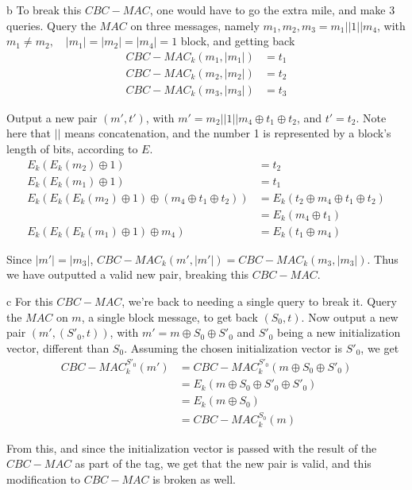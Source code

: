 \documentclass{article}
\begin{document}
\begin{paragraph}
    b To break this $CBC-MAC$, one would have to go the extra mile, and make 3 queries. Query the $MAC$ on three messages, namely $m_1, m_2, m_3 = m_1 || 1 || m_4$, with $m_1 \neq m_2, \quad |m_1| = |m_2| = |m_4| = 1$ block, and getting back
    \begin{align*}
        CBC-MAC_k(m_1, |m_1|) &= t_1\\
        CBC-MAC_k(m_2, |m_2|) &= t_2\\
        CBC-MAC_k(m_3, |m_3|) &= t_3
    \end{align*}
    
    Output a new pair $(m', t')$, with $m' = m_2 || 1 || m_4 \oplus t_1 \oplus t_2$, and $t' = t_2$. Note here that $||$ means concatenation, and the number 1 is represented by a block's length of bits, according to $E$.
    \begin{align*}
        E_k(E_k(m_2) \oplus 1) &= t_2\\
        E_k(E_k(m_1) \oplus 1) &= t_1\\
        E_k(E_k(E_k(m_2) \oplus 1) \oplus (m_4 \oplus t_1 \oplus t_2)) &= E_k(t_2 \oplus m_4 \oplus t_1 \oplus t_2)\\
        &= E_k(m_4 \oplus t_1)\\
        E_k(E_k(E_k(m_1) \oplus 1) \oplus m_4) &= E_k(t_1 \oplus m_4)
    \end{align*}
    
    Since $|m'| = |m_3|$, $CBC-MAC_k(m', |m'|) = CBC-MAC_k(m_3, |m_3|)$. Thus we have outputted a valid new pair, breaking this $CBC-MAC$.
\end{paragraph}

\begin{paragraph}
    c For this $CBC-MAC$, we're back to needing a single query to break it. Query the $MAC$ on $m$, a single block message, to get back $(S_0, t)$. Now output a new pair $(m', (S'_0, t))$, with $m' = m \oplus S_0 \oplus S'_0$ and $S'_0$ being a new initialization vector, different than $S_0$. Assuming the chosen initialization vector is $S'_0$, we get
    \begin{align*}
        CBC-MAC_k^{S'_0}(m') &= CBC-MAC_k^{S'_0}(m \oplus S_0 \oplus S'_0)\\
        &= E_k(m \oplus S_0 \oplus S'_0 \oplus S'_0)\\
        &= E_k(m \oplus S_0)\\
        &= CBC-MAC_k^{S_0}(m)
    \end{align*}
    
    From this, and since the initialization vector is passed with the result of the $CBC-MAC$ as part of the tag, we get that the new pair is valid, and this modification to $CBC-MAC$ is broken as well.
\end{paragraph}
\end{document}
